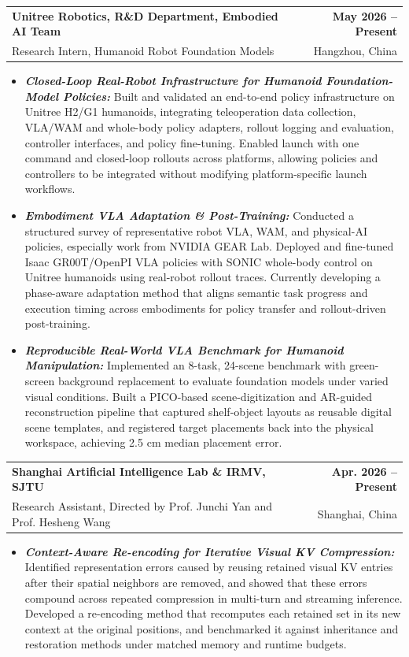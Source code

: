 \documentclass[11pt,letterpaper]{article}
\makeatletter
\newcommand{\resumeSubheading}[4]{
    \begin{tabularx}{\textwidth}{@{}Xr@{}}
        \textbf{#1} & \textbf{#2} \\
        #3 & #4 \\
    \end{tabularx}
}
\newcommand{\resumeItem}[1]{
    \item #1
}
\makeatother
\begin{document}
\resumeSubheading
{ Unitree Robotics, R\&D Department, Embodied AI Team}
{May 2026 -- Present}
{\hspace*{1.4em}Research Intern, Humanoid Robot Foundation Models}
{Hangzhou, China}
\begin{itemize}[leftmargin=2.4em, itemsep=0.5pt, topsep=0pt]
    \small
    \resumeItem{\textbf{\textit{Closed-Loop Real-Robot Infrastructure for Humanoid Foundation-Model Policies:}} Built and validated an end-to-end policy infrastructure on Unitree H2/G1 humanoids, integrating teleoperation data collection, VLA/WAM and whole-body policy adapters, rollout logging and evaluation, controller interfaces, and policy fine-tuning. Enabled launch with one command and closed-loop rollouts across platforms, allowing policies and controllers to be integrated without modifying platform-specific launch workflows.}
    \resumeItem{\textbf{\textit{Embodiment VLA Adaptation \& Post-Training:}} Conducted a structured survey of representative robot VLA, WAM, and physical-AI policies, especially work from NVIDIA GEAR Lab. Deployed and fine-tuned Isaac GR00T/OpenPI VLA policies with SONIC whole-body control on Unitree humanoids using real-robot rollout traces. Currently developing a phase-aware adaptation method that aligns semantic task progress and execution timing across embodiments for policy transfer and rollout-driven post-training.}
    \resumeItem{\textbf{\textit{Reproducible Real-World VLA Benchmark for Humanoid Manipulation:}} Implemented an 8-task, 24-scene benchmark with green-screen background replacement to evaluate foundation models under varied visual conditions. Built a PICO-based scene-digitization and AR-guided reconstruction pipeline that captured shelf-object layouts as reusable digital scene templates, and registered target placements back into the physical workspace, achieving 2.5 cm median placement error.}
\end{itemize}

\resumeSubheading
{Shanghai Artificial Intelligence Lab \& IRMV, SJTU }
{Apr. 2026 -- Present}
{\hspace*{1.4em}Research Assistant, Directed by Prof. Junchi Yan and Prof. Hesheng Wang}
{Shanghai, China}
\begin{itemize}[leftmargin=2.4em, itemsep=0.5pt, topsep=0pt]
    \small
    \resumeItem{\textbf{\textit{Context-Aware Re-encoding for Iterative Visual KV Compression:}} Identified representation errors caused by reusing retained visual KV entries after their spatial neighbors are removed, and showed that these errors compound across repeated compression in multi-turn and streaming inference. Developed a re-encoding method that recomputes each retained set in its new context at the original positions, and benchmarked it against inheritance and restoration methods under matched memory and runtime budgets.}
\end{itemize}
\end{document}
